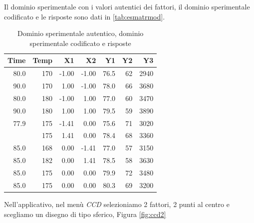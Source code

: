 \documentclass[
  11pt,
]{book}
\begin{document}
Il dominio sperimentale con i valori autentici dei fattori, il dominio sperimentale codificato e le risposte sono dati in \autoref{tab:esmatrmod}.
\newpage

\begin{table}

\caption{\label{tab:esmatrmod}Dominio sperimentale autentico, dominio sperimentale
codificato e risposte}
\centering
\begin{tabular}[t]{rrrrrrr}
\toprule
Time & Temp & X1 & X2 & Y1 & Y2 & Y3\\
\midrule
80.0 & 170 & -1.00 & -1.00 & 76.5 & 62 & 2940\\
90.0 & 170 & 1.00 & -1.00 & 78.0 & 66 & 3680\\
80.0 & 180 & -1.00 & 1.00 & 77.0 & 60 & 3470\\
90.0 & 180 & 1.00 & 1.00 & 79.5 & 59 & 3890\\
77.9 & 175 & -1.41 & 0.00 & 75.6 & 71 & 3020\\
\addlinespace
92.1 & 175 & 1.41 & 0.00 & 78.4 & 68 & 3360\\
85.0 & 168 & 0.00 & -1.41 & 77.0 & 57 & 3150\\
85.0 & 182 & 0.00 & 1.41 & 78.5 & 58 & 3630\\
85.0 & 175 & 0.00 & 0.00 & 79.9 & 72 & 3480\\
85.0 & 175 & 0.00 & 0.00 & 80.3 & 69 & 3200\\
\bottomrule
\end{tabular}
\end{table}

Nell'applicativo, nel menù \emph{CCD} selezioniamo 2 fattori, 2 punti al centro e scegliamo un disegno di tipo sferico, Figura \ref{fig:ccd2}
\newpage
\end{document}

